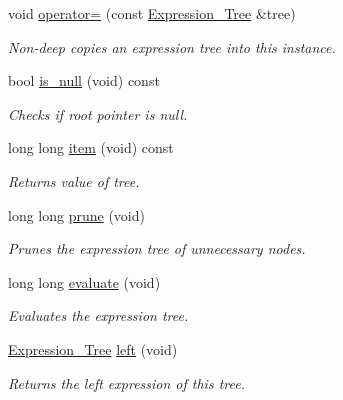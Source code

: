 \begin{DoxyCompactItemize}
void \hyperlink{classMadara_1_1Expression__Tree_1_1Expression__Tree_a85a61dd28e6ade83bab02261363368ad}{operator=} (const \hyperlink{classMadara_1_1Expression__Tree_1_1Expression__Tree}{Expression\_\-Tree} \&tree)
\begin{DoxyCompactList}\small\item\em Non-\/deep copies an expression tree into this instance. \item\end{DoxyCompactList}\item 
bool \hyperlink{classMadara_1_1Expression__Tree_1_1Expression__Tree_a9c4b052d51dbf4eddf53c7a8c30ac146}{is\_\-null} (void) const 
\begin{DoxyCompactList}\small\item\em Checks if root pointer is null. \item\end{DoxyCompactList}\item 
long long \hyperlink{classMadara_1_1Expression__Tree_1_1Expression__Tree_a55e7939e536d8c1d741c3fb429da1245}{item} (void) const 
\begin{DoxyCompactList}\small\item\em Returns value of tree. \item\end{DoxyCompactList}\item 
long long \hyperlink{classMadara_1_1Expression__Tree_1_1Expression__Tree_a1cfb1d17c39590fb927d5ac9fc1b6a44}{prune} (void)
\begin{DoxyCompactList}\small\item\em Prunes the expression tree of unnecessary nodes. \item\end{DoxyCompactList}\item 
long long \hyperlink{classMadara_1_1Expression__Tree_1_1Expression__Tree_a23246efa474c996687c43fac8de871e8}{evaluate} (void)
\begin{DoxyCompactList}\small\item\em Evaluates the expression tree. \item\end{DoxyCompactList}\item 
\hyperlink{classMadara_1_1Expression__Tree_1_1Expression__Tree}{Expression\_\-Tree} \hyperlink{classMadara_1_1Expression__Tree_1_1Expression__Tree_afa2ed8833e24ed45219056f3d07ffe54}{left} (void)
\begin{DoxyCompactList}\small\item\em Returns the left expression of this tree. \item\end{DoxyCompactList}\item 

\end{DoxyCompactItemize}
